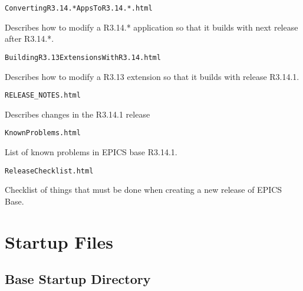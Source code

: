 \begin{description}
\end{description}\begin{verbatim}ConvertingR3.14.*AppsToR3.14.*.html
\end{verbatim}\begin{description}\item Describes how to modify a R3.14.* application so that it builds with next release after R3.14.*.

\end{description}\begin{verbatim}BuildingR3.13ExtensionsWithR3.14.html
\end{verbatim}\begin{description}\item Describes how to modify a R3.13 extension so that it builds with release R3.14.1.

\end{description}\begin{verbatim}RELEASE_NOTES.html
\end{verbatim}\begin{description}\item Describes changes in the R3.14.1 release

\end{description}\begin{verbatim}KnownProblems.html
\end{verbatim}\begin{description}\item List of known problems in EPICS base R3.14.1.

\end{description}\begin{verbatim}ReleaseChecklist.html
\end{verbatim}\begin{description}\item Checklist of things that must be done when creating a new release of EPICS Base.

\end{description}\section{Startup Files}

\subsection{Base Startup Directory}

